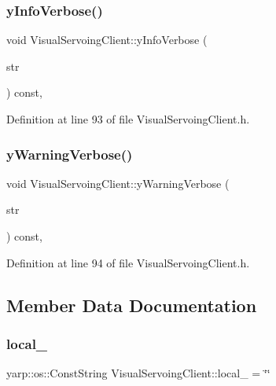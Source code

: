 \subsubsection{\texorpdfstring{y\+Info\+Verbose()}{yInfoVerbose()}}
{\footnotesize\ttfamily void Visual\+Servoing\+Client\+::y\+Info\+Verbose (\begin{DoxyParamCaption}\item[{const yarp\+::os\+::\+Const\+String \&}]{str }\end{DoxyParamCaption}) const\hspace{0.3cm}{\ttfamily [inline]}, {\ttfamily [private]}}



Definition at line 93 of file Visual\+Servoing\+Client.\+h.

\mbox{\label{classVisualServoingClient_ab9c5c456032851ef0bec5b97980a97f8}} 
\subsubsection{\texorpdfstring{y\+Warning\+Verbose()}{yWarningVerbose()}}
{\footnotesize\ttfamily void Visual\+Servoing\+Client\+::y\+Warning\+Verbose (\begin{DoxyParamCaption}\item[{const yarp\+::os\+::\+Const\+String \&}]{str }\end{DoxyParamCaption}) const\hspace{0.3cm}{\ttfamily [inline]}, {\ttfamily [private]}}



Definition at line 94 of file Visual\+Servoing\+Client.\+h.



\subsection{Member Data Documentation}
\mbox{\label{classVisualServoingClient_a0b485c388dfe357bd5b504bc87449ff5}} 
\subsubsection{\texorpdfstring{local\+\_\+}{local\_}}
{\footnotesize\ttfamily yarp\+::os\+::\+Const\+String Visual\+Servoing\+Client\+::local\+\_\+ = \char`\"{}\char`\"{}\hspace{0.3cm}{\ttfamily [private]}}



